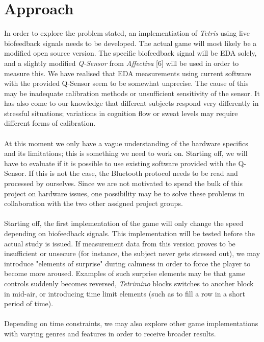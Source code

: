 \documentclass[paper=a4, fontsize=11pt]{scrartcl} %
\numberwithin{equation}{section} %
\numberwithin{figure}{section} %
\numberwithin{table}{section} %
\begin{document}
\section{Approach}
In order to explore the problem stated, an implementiation of \textit{Tetris} using live biofeedback signals needs to be developed. The actual game will most likely be a modified open source version. The specific biofeedback signal will be EDA solely, and a slightly modified \textit{Q-Sensor} from \textit{Affectiva} [6] will be used in order to measure this. We have realised that EDA measurements using current software with the provided Q-Sensor seem to be somewhat unprecise. The cause of this may be inadequate calibration methods or unsufficient sensitivity of the sensor. It has also come to our knowledge that different subjects respond very differently in stressful situations; variations in cognition flow or sweat levels may require different forms of calibration. 
\\ \\
At this moment we only have a vague understanding of the hardware specifics and its limitations; this is something we need to work on. Starting off, we will have to evaluate if it is possible to use existing software provided with the Q-Sensor. If this is not the case, the Bluetooth protocol needs to be read and processed by ourselves. Since we are not motivated to spend the bulk of this project on hardware issues, one possibility may be to solve these problems in collaboration with the two other assigned project groups.
\\ \\
Starting off, the first implementation of the game will only change the speed depending on biofeedback signals. This implementation will be tested before the actual study is issued. If measurement data from this version proves to be insufficient or unsecure (for instance, the subject never gets stressed out), we may introduce "elements of surprise" during calmness in order to force the player to become more aroused. Examples of such surprise elements may be that game controls suddenly becomes reversed, \textit{Tetrimino} blocks switches to another block in mid-air, or introducing time limit elements (such as to fill a row in a short period of time).
\\ \\
Depending on time constraints, we may also explore other game implementations with varying genres and features in order to receive broader results.

\end{document}
